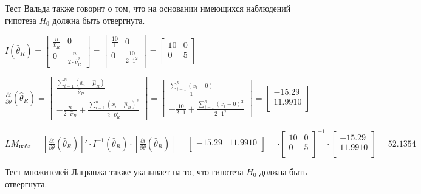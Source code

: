 \documentclass[pdftex,11pt,openany]{book}\usepackage[]{graphicx}\usepackage[]{color}
\begin{document}
\begin{solution}
Тест Вальда также говорит о том, что на основании имеющихся наблюдений гипотеза $H_0$ должна быть отвергнута.

$I(\hat{\theta}_{R}) = \begin{bmatrix}
\frac{n}{\hat{\nu}_{R}} & 0 \\
0 & \frac{n}{2 \cdot \hat{\nu}_{R}^2}
\end{bmatrix} = \begin{bmatrix}
\frac{10}{1} & 0 \\
0 & \frac{10}{2\cdot 1^2} \\
\end{bmatrix} = \begin{bmatrix}
10 & 0\\
0 & 5 \\
\end{bmatrix}$

$\frac{\partial l}{\partial \theta}(\hat{\theta}_{R}) = \begin{bmatrix}
\frac{\sum_{i=1}^n (x_i - \hat{\mu}_R)}{\hat{\nu}_R}\\
-\frac{n}{2\cdot \hat{\nu}_R} + \frac{\sum_{i=1}^n (x_i - \hat{\mu}_R)^2}{2 \cdot \hat{\nu}_R^2}
\end{bmatrix} = \begin{bmatrix}
\frac{\sum_{i=1}^n (x_i - 0)}{1}\\
-\frac{10}{2\cdot 1} + \frac{\sum_{i=1}^n (x_i - 0)^2}{2 \cdot 1^2}
\end{bmatrix} = \begin{bmatrix}
-15.29 \\
11.9910\\
\end{bmatrix}$

$LM_{\text{набл}} = \left[ \frac{\partial l}{\partial \theta}(\hat{\theta}_{R}) \right]' \cdot I^{-1}(\hat{\theta}_{R}) \cdot \left[ \frac{\partial l}{\partial \theta}(\hat{\theta}_{R}) \right] = \begin{bmatrix}
-15.29 & 11.9910 \\
\end{bmatrix} = \cdot \begin{bmatrix}
10 & 0\\
0 & 5 \\
\end{bmatrix}^{-1} \cdot \begin{bmatrix}
-15.29 \\
11.9910\\
\end{bmatrix} = 52.1354$

Тест множителей Лагранжа также указывает на то, что гипотеза $H_0$ должна быть отвергнута.
\end{solution}
\end{document}
